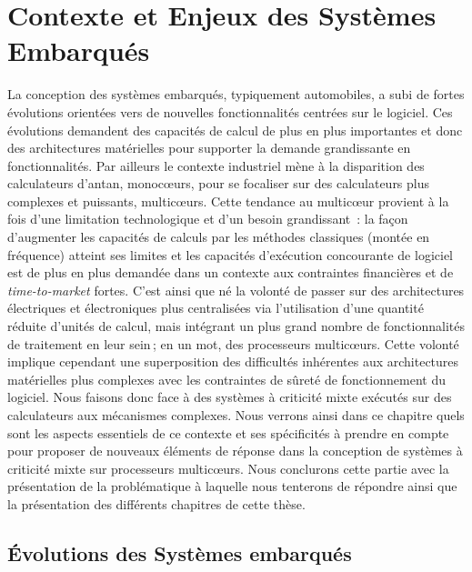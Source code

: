 \documentclass[french, a4paper, 11pt, twoside, pdftex]{StyleThese}
\begin{document}
\setcounter{chapter}{1}
\dominitoc
\faketableofcontents
\fi

\chapter{Contexte et Enjeux des Systèmes Embarqués} \label{chap:1_EnjeuxIntro}
\minitoc

La conception des systèmes embarqués, typiquement automobiles, a subi de fortes évolutions orientées vers de nouvelles fonctionnalités centrées sur le logiciel. 
Ces évolutions demandent des capacités de calcul de plus en plus importantes et donc des architectures matérielles pour supporter la demande grandissante en fonctionnalités. 
Par ailleurs le contexte industriel mène à la disparition des calculateurs d'antan, monocœurs, pour se focaliser sur des calculateurs plus complexes et puissants, multicœurs. 
Cette tendance au multicœur provient à la fois d'une limitation technologique et d'un besoin grandissant~: la façon d'augmenter les capacités de calculs par les méthodes classiques (montée en fréquence) atteint ses limites et les capacités d'exécution concourante de logiciel est de plus en plus demandée dans un contexte aux contraintes financières et de \textit{time-to-market} fortes. 
C'est ainsi que né la volonté de passer sur des architectures électriques et électroniques plus centralisées via l'utilisation d'une quantité réduite d'unités de calcul, mais intégrant un plus grand nombre de fonctionnalités de traitement en leur sein ; en un mot, des processeurs multicœurs. Cette volonté implique cependant une superposition des difficultés inhérentes aux architectures matérielles plus complexes avec les contraintes de sûreté de fonctionnement du logiciel. Nous faisons donc face à des systèmes à criticité mixte exécutés sur des calculateurs aux mécanismes complexes. Nous verrons ainsi dans ce chapitre quels sont les aspects essentiels de ce contexte et ses spécificités à prendre en compte pour proposer de nouveaux éléments de réponse dans la conception de systèmes à criticité mixte sur processeurs multicœurs. Nous conclurons cette partie avec la présentation de la problématique à laquelle nous tenterons de répondre ainsi que la présentation des différents chapitres de cette thèse.

\section{Évolutions des Systèmes embarqués}
\end{document}
